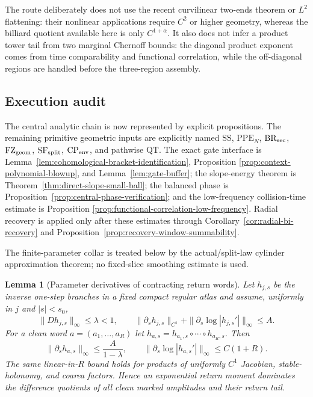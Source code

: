 \documentclass[11pt]{article}
\newtheorem{lemma}[theorem]{Lemma}
\begin{document}
The route deliberately does not use the recent curvilinear two-ends theorem
or $L^2$ flattening: their nonlinear applications require $C^2$ or higher
geometry, whereas the billiard quotient available here is only
$C^{1+\alpha}$.  It also does not infer a product tower tail from two
marginal Chernoff bounds: the diagonal product exponent comes from time
comparability and functional correlation, while the off-diagonal regions are
handled before the three-region assembly.

\subsection{Execution audit}

The central analytic chain is now represented by explicit propositions.
The remaining primitive geometric inputs are explicitly named
$\mathrm{SS}$, $\mathrm{PPE}_{N}$, $\mathrm{BR}_{\rm sec}$,
$\mathrm{FZ}_{\rm geom}$,
$\mathrm{SF}_{\rm split}$, $\mathrm{CP}_{\rm env}$, and pathwise
$\mathrm{QT}$.  The exact gate interface is
Lemma~\ref{lem:cohomological-bracket-identification}, Proposition
\ref{prop:context-polynomial-blowup}, and Lemma~\ref{lem:gate-buffer}; the
slope-energy theorem is Theorem~\ref{thm:direct-slope-small-ball}; the
balanced phase is Proposition~\ref{prop:central-phase-verification}; and the
low-frequency collision-time estimate is Proposition
\ref{prop:functional-correlation-low-frequency}.  Radial recovery is applied
only after these estimates through Corollary~\ref{cor:radial-bi-recovery} and
Proposition~\ref{prop:recovery-window-summability}.

The finite-parameter collar is treated below by the actual/split-law cylinder
approximation theorem; no fixed-slice smoothing estimate is used.

\begin{lemma}[Parameter derivatives of contracting return words]
\label{lem:parametric-inverse-word}
Let $h_{j,s}$ be the inverse one-step branches in a fixed compact regular
atlas and assume, uniformly in $j$ and $|s|<s_0$,
\[
 \|Dh_{j,s}\|_\infty\le\lambda<1,
 \qquad
 \|\partial_sh_{j,s}\|_{C^1}
 +\|\partial_s\log|h_{j,s}'|\|_\infty\le A.
\]
For a clean word $a=(a_1,\ldots,a_R)$ let
$h_{a,s}=h_{a_1,s}\circ\cdots\circ h_{a_R,s}$.  Then
\begin{equation}
\label{eq:parametric-word-bounds}
 \|\partial_s h_{a,s}\|_\infty\le \frac{A}{1-\lambda},
 \qquad
 \|\partial_s\log|h_{a,s}'|\|_\infty\le C(1+R).
\end{equation}
The same linear-in-$R$ bound holds for products of uniformly $C^1$
Jacobian, stable-holonomy, and coarea factors.  Hence an exponential return
moment dominates the difference quotients of all clean marked amplitudes and
their return tail.
\end{lemma}
\end{document}
